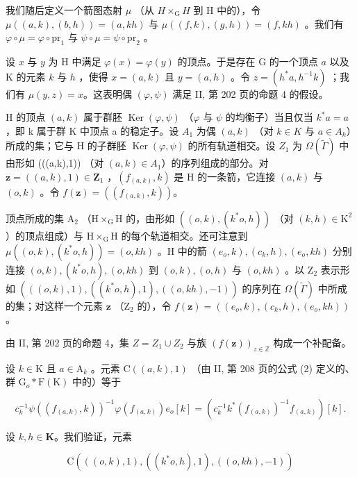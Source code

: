 我们随后定义一个箭图态射 \(\mu\) （从 \(H \times_{\mathrm{G}} H\) 到 H 中的），令 \(\mu((a,k),(b,h)) = (a,kh)\) 与 \(\mu((f,k),(g,h)) = (f,kh)\) 。我们有 \(\varphi \circ \mu = \varphi \circ \mathrm{pr}_1\) 与 \(\psi \circ \mu = \psi \circ \mathrm{pr}_2\) 。

设 \(x\) 与 \(y\) 为 H 中满足 \(\varphi(x) = \varphi(y)\) 的顶点。于是存在 G 的一个顶点 \(a\) 以及 K 的元素 \(k\) 与 \(h\) ，使得 \(x = (a, k)\) 且 \(y = (a, h)\) 。令 \(z = (h^* a, h^{-1} k)\) ；我们有 \(\mu(y, z) = x\)。这表明偶 \((\varphi, \psi)\) 满足 II, 第 202 页的命题 4 的假设。

H 的顶点 \((a,k)\) 属于群胚 \(\operatorname{Ker}(\varphi,\psi)\) （\(\varphi\) 与 \(\psi\) 的均衡子）当且仅当 \(k^{*}a=a\) ，即 k 属于群 K 中顶点 a 的稳定子。设 \(A_{1}\) 为偶 \((a,k)\) （对 \(k\in K\) 与 \(a\in A_{k}\)）所成的集；它与 H 的子群胚 \(\operatorname{Ker}(\varphi,\psi)\) 的所有轨道相交。设 \(Z_{1}\) 为 \(\Omega(\widetilde{\Gamma})\) 中由形如 (((a,k),1)) （对 \((a,k)\in A_{1}\)）的序列组成的部分。对 \(\mathbf{z}=((a,k),1)\in\mathbf{Z}_{1}\) ，\((f_{(a,k)},k)\) 是 H 的一条箭，它连接 \((a,k)\) 与 \((o,k)\) 。令 \(f(\mathbf{z})=((f_{(a,k)},k))\)。

顶点所成的集 \(\mathrm{A}_2\) （\(\mathrm{H} \times_{\mathrm{G}} \mathrm{H}\) 的，由形如 \(((o,k), (k^*o,h))\) （对 \((k,h) \in \mathrm{K}^2\) ）的顶点组成）与 \(\mathrm{H} \times_{\mathrm{G}} \mathrm{H}\) 的每个轨道相交。还可注意到 \(\mu((o,k), (k^*o,h)) = (o,kh)\) 。H 中的箭 \((e_o,k), (c_k,h), (e_o,kh)\) 分别连接 \((o,k), (k^*o,h), (o,kh)\) 到 \((o,k), (o,h)\) 与 \((o,kh)\) 。以 \(\mathrm{Z}_2\) 表示形如 \((((o,k),1), ((k^*o,h), 1), ((o,kh), -1))\) 的序列在 \(\Omega(\widetilde{\Gamma})\) 中所成的集；对这样一个元素 \(\mathbf{z}\) （\(\mathrm{Z}_2\) 的），令 \(f(\mathbf{z}) = ((e_o,k), (c_k,h), (e_o,kh))\) 。

由 II, 第 202 页的命题 4，集 \(Z = Z_1 \cup Z_2\) 与族 \((f(\mathbf{z}))_{z \in \mathbb{Z}}\) 构成一个补配备。

设 \(k \in \mathrm{K}\) 且 \(a \in \mathrm{A}_k\) 。元素 \(\mathrm{C}((a, k), 1)\) （由 II, 第 208 页的公式 (2) 定义的、群 \(\mathrm{G}_o * \mathrm{F}(\mathrm{K})\) 中的）等于

\[
c _ {k} ^ {- 1} \psi ((f _ {(a, k)}, k)) ^ {- 1} \varphi (f _ {(a, k)}) e _ {o} [ k ] = (c _ {k} ^ {- 1} k ^ {*} (f _ {(a, k)}) ^ {- 1} f _ {(a, k)}) [ k ].\tag{4}
\]

设 \(k,h \in \mathbf{K}\)。我们验证，元素

\[
\mathrm{C} (((o, k), 1), ((k ^ {*} o, h), 1), ((o, k h), - 1))
\]

